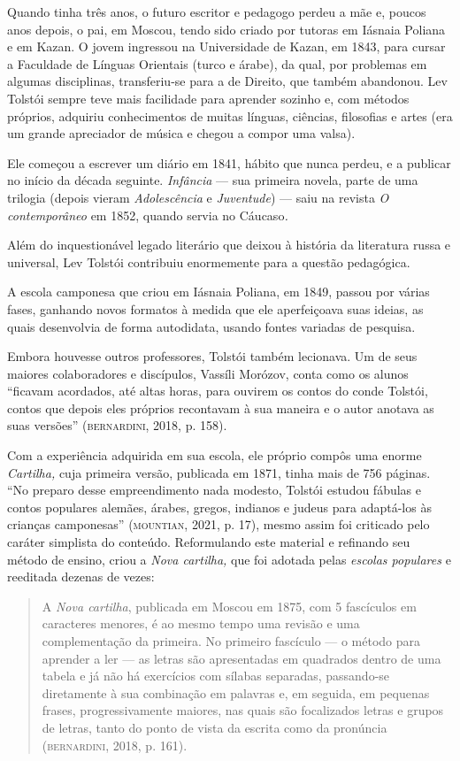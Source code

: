 \documentclass[11pt]{extarticle}
\begin{document}
Quando tinha três anos, o futuro escritor e pedagogo perdeu a mãe e,
poucos anos depois, o pai, em Moscou, tendo sido criado por tutoras em
Iásnaia Poliana e em Kazan. O jovem ingressou na Universidade de Kazan,
em 1843, para cursar a Faculdade de Línguas Orientais (turco e árabe),
da qual, por problemas em algumas disciplinas, transferiu-se para a de
Direito, que também abandonou. Lev Tolstói sempre teve mais facilidade
para aprender sozinho e, com métodos próprios, adquiriu conhecimentos de
muitas línguas, ciências, filosofias e artes (era um grande apreciador
de música e chegou a compor uma valsa).

Ele começou a escrever um diário em 1841, hábito que nunca perdeu, e a
publicar no início da década seguinte. \emph{Infância} --- sua primeira
novela, parte de uma trilogia (depois vieram \emph{Adolescência} e
\emph{Juventude}) --- saiu na revista \emph{O contemporâneo} em 1852,
quando servia no Cáucaso\emph{.}

Além do inquestionável legado literário que deixou à história da
literatura russa e universal, Lev Tolstói contribuiu enormemente para a
questão pedagógica.

A escola camponesa que criou em Iásnaia Poliana, em 1849, passou por
várias fases, ganhando novos formatos à medida que ele aperfeiçoava suas
ideias, as quais desenvolvia de forma autodidata, usando fontes variadas
de pesquisa.

Embora houvesse outros professores, Tolstói também lecionava. Um de seus
maiores colaboradores e discípulos, Vassíli Morózov, conta como os
alunos ``ficavam acordados, até altas horas, para ouvirem os contos do
conde Tolstói, contos que depois eles próprios recontavam à sua maneira
e o autor anotava as suas versões'' (\textsc{bernardini}, 2018, p. 158).

Com a experiência adquirida em sua escola, ele próprio compôs uma enorme
\emph{Cartilha,} cuja primeira versão, publicada em 1871, tinha mais de
756 páginas. ``No preparo desse empreendimento nada modesto, Tolstói
estudou fábulas e contos populares alemães, árabes, gregos, indianos e
judeus para adaptá-los às crianças camponesas'' (\textsc{mountian}, 2021, p. 17),
mesmo assim foi criticado pelo caráter simplista do conteúdo.
Reformulando este material e refinando seu método de ensino, criou a
\emph{Nova cartilha,} que foi adotada pelas \emph{escolas populares} e
reeditada dezenas de vezes:

\begin{quote}
A \emph{Nova cartilha}, publicada em Moscou em 1875, com 5 fascículos em
caracteres menores, é ao mesmo tempo uma revisão e uma complementação da
primeira. No primeiro fascículo --- o método para aprender a ler --- as
letras são apresentadas em quadrados dentro de uma tabela e já não há
exercícios com sílabas separadas, passando-se diretamente à sua
combinação em palavras e, em seguida, em pequenas frases,
progressivamente maiores, nas quais são focalizados letras e grupos de
letras, tanto do ponto de vista da escrita como da pronúncia
(\textsc{bernardini}, 2018, p. 161).
\end{quote}
\end{document}
